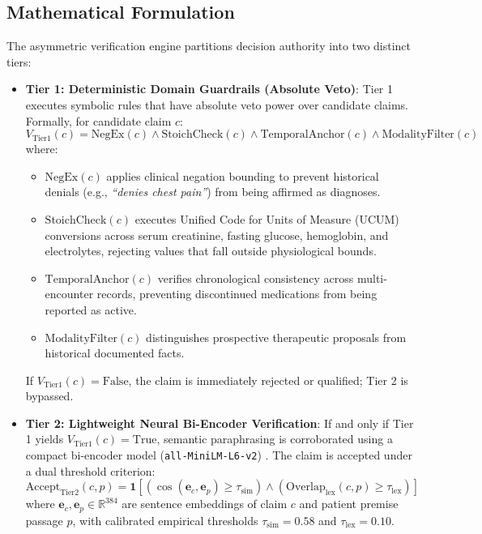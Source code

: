 \subsection{Mathematical Formulation}
The asymmetric verification engine partitions decision authority into two distinct tiers:
\begin{itemize}
  \item \textbf{Tier 1: Deterministic Domain Guardrails (Absolute Veto)}: Tier 1 executes symbolic rules that have absolute veto power over candidate claims. Formally, for candidate claim $c$:
  \begin{equation}
  V_{\text{Tier1}}(c) = \text{NegEx}(c) \land \text{StoichCheck}(c) \land \text{TemporalAnchor}(c) \land \text{ModalityFilter}(c)
  \end{equation}
  where:
  \begin{itemize}
    \item $\text{NegEx}(c)$ applies clinical negation bounding \cite{chapman2001negex,harkema2009context} to prevent historical denials (e.g., \textit{``denies chest pain''}) from being affirmed as diagnoses.
    \item $\text{StoichCheck}(c)$ executes Unified Code for Units of Measure (UCUM) conversions \cite{schadow1999ucum} across serum creatinine, fasting glucose, hemoglobin, and electrolytes, rejecting values that fall outside physiological bounds.
    \item $\text{TemporalAnchor}(c)$ verifies chronological consistency across multi-encounter records, preventing discontinued medications from being reported as active.
    \item $\text{ModalityFilter}(c)$ distinguishes prospective therapeutic proposals from historical documented facts.
  \end{itemize}
  If $V_{\text{Tier1}}(c) = \text{False}$, the claim is immediately rejected or qualified; Tier 2 is bypassed.

  \item \textbf{Tier 2: Lightweight Neural Bi-Encoder Verification}: If and only if Tier 1 yields $V_{\text{Tier1}}(c) = \text{True}$, semantic paraphrasing is corroborated using a compact bi-encoder model (\texttt{all-MiniLM-L6-v2}) \cite{reimers2019sentencebert,wang2020minilm}. The claim is accepted under a dual threshold criterion:
  \begin{equation}
  \text{Accept}_{\text{Tier2}}(c, p) = \mathbf{1}\left[ \left(\cos(\mathbf{e}_c, \mathbf{e}_p) \ge \tau_{\text{sim}}\right) \land \left(\text{Overlap}_{\text{lex}}(c, p) \ge \tau_{\text{lex}}\right) \right]
  \end{equation}
  where $\mathbf{e}_c, \mathbf{e}_p \in \mathbb{R}^{384}$ are sentence embeddings of claim $c$ and patient premise passage $p$, with calibrated empirical thresholds $\tau_{\text{sim}} = 0.58$ and $\tau_{\text{lex}} = 0.10$.
\end{itemize}

